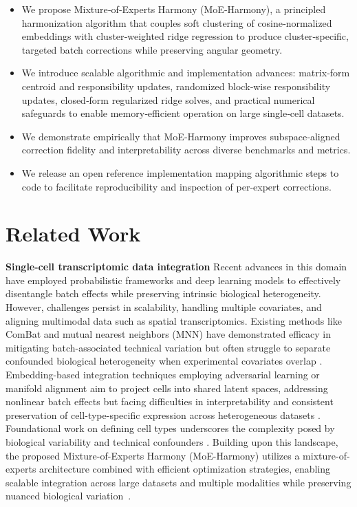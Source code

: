 \documentclass{article}
\begin{document}
\begin{itemize}
\item We propose Mixture‑of‑Experts Harmony (MoE‑Harmony), a principled harmonization algorithm that couples soft clustering of cosine‑normalized embeddings with cluster‑weighted ridge regression to produce cluster‑specific, targeted batch corrections while preserving angular geometry.
\item We introduce scalable algorithmic and implementation advances: matrix‑form centroid and responsibility updates, randomized block‑wise responsibility updates, closed‑form regularized ridge solves, and practical numerical safeguards to enable memory‑efficient operation on large single‑cell datasets.
\item We demonstrate empirically that MoE‑Harmony improves subspace‑aligned correction fidelity and interpretability across diverse benchmarks and metrics.
\item We release an open reference implementation mapping algorithmic steps to code to facilitate reproducibility and inspection of per‑expert corrections.
\end{itemize}

\section{Related Work}

\textbf{Single-cell transcriptomic data integration} Recent advances in this domain have employed probabilistic frameworks and deep learning models to effectively disentangle batch effects while preserving intrinsic biological heterogeneity. However, challenges persist in scalability, handling multiple covariates, and aligning multimodal data such as spatial transcriptomics. Existing methods like ComBat and mutual nearest neighbors (MNN) have demonstrated efficacy in mitigating batch-associated technical variation but often struggle to separate confounded biological heterogeneity when experimental covariates overlap \citep{Bttner2018ATM,Haghverdi2018BatchEI}. Embedding-based integration techniques employing adversarial learning or manifold alignment aim to project cells into shared latent spaces, addressing nonlinear batch effects but facing difficulties in interpretability and consistent preservation of cell-type-specific expression across heterogeneous datasets \citep{Liu2020JointlyDC,Regev2017TheHC}. Foundational work on defining cell types underscores the complexity posed by biological variability and technical confounders \citep{Regev2017TheHC}. Building upon this landscape, the proposed Mixture-of-Experts Harmony (MoE-Harmony) utilizes a mixture-of-experts architecture combined with efficient optimization strategies, enabling scalable integration across large datasets and multiple modalities while preserving nuanced biological variation~\citep{Maan2022TheDI,Dou2020UnbiasedIO}.
\end{document}
